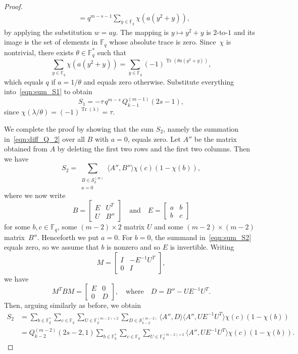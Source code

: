 \documentclass[10pt]{article}
\theoremstyle{definition}
\newcommand{\FF}{\mathbb{F}}
\renewcommand{\S}{\mathscr{S}}
\newcommand{\ang}[1]{\langle#1\rangle}
\newcommand{\sums}[1]{\sum_{\substack{#1}}}
\DeclareMathOperator{\Tr}{Tr}
\begin{document}
\begin{proof}
\begin{align*}
&=q^{m-s-1}\sum_{y\in\FF_q}\chi(a(y^2+y)),
\end{align*}
by applying the substitution $w=ay$. The mapping is $y\mapsto y^2+y$ is $2$-to-$1$ and its image is the set of elements in $\FF_q$ whose absolute trace is zero. Since~$\chi$ is nontrivial, there exists $\theta\in\FF_q^*$ such that
\[
\sum_{y\in\FF_q}\chi(a(y^2+y))=\sum_{y\in\FF_q}(-1)^{\Tr(\theta a(y^2+y))},
\]
which equals $q$ if $a=1/\theta$ and equals zero otherwise. Substitute everything into~\eqref{eqn:sum_S1} to obtain
\[
S_1=-\tau\, q^{m-s}\,Q^{(m-1)}_{k-1}(2s-1),
\]
since $\chi(\lambda/\theta)=(-1)^{\Tr(\lambda)}=\tau$. 
\par
We complete the proof by showing that the sum $S_2$, namely the summation in~\eqref{eqn:diff_Q_2} over all $B$ with $a=0$, equals zero. Let $A''$ be the matrix obtained from $A$ by deleting the first two rows and the first two columns. Then we have
\begin{equation}
S_2=\sums{B\in\S^{(m)}_k\\a=0}\ang{A'',B''}\chi(c)(1-\chi(b)),   \label{eqn:sum_S2}
\end{equation}
where we now write
\[
B=\begin{bmatrix}
E & U^T\\
U & B''
\end{bmatrix}
\quad\text{and}\quad
E=\begin{bmatrix}
a & b\\
b & c
\end{bmatrix}
\]
for some $b,c\in\FF_q$, some $(m-2)\times 2$ matrix $U$ and some $(m-2)\times(m-2)$ matrix~$B''$. Henceforth we put $a=0$. For $b=0$, the summand in~\eqref{eqn:sum_S2} equals zero, so we assume that $b$ is nonzero and so $E$ is invertible. Writing 
\[
M=\begin{bmatrix}
I & -E^{-1}U^T\\
0 & I
\end{bmatrix},
\]
we have
\[
M^TBM=\begin{bmatrix}
E & 0\\
0 & D
\end{bmatrix},
\quad\text{where}\quad
D=B''-UE^{-1}U^T.
\]
Then, arguing similarly as before, we obtain
\begin{align*}
S_2&=\sum_{b\in\FF_q^*}\sum_{c\in\FF_q}\sum_{U\in\FF_q^{(m-2)\times 2}}\sum_{D\in\S^{(m-2)}_{k-2}}\ang{A'',D}\ang{A'',UE^{-1}U^T}\chi(c)(1-\chi(b))\\
&=Q^{(m-2)}_{k-2}(2s-2,1)\sum_{b\in\FF_q^*}\sum_{c\in\FF_q}\sum_{U\in\FF_q^{(m-2)\times 2}}\ang{A'',UE^{-1}U^T}\chi(c)(1-\chi(b)).

\end{align*}
\end{proof}
\end{document}
